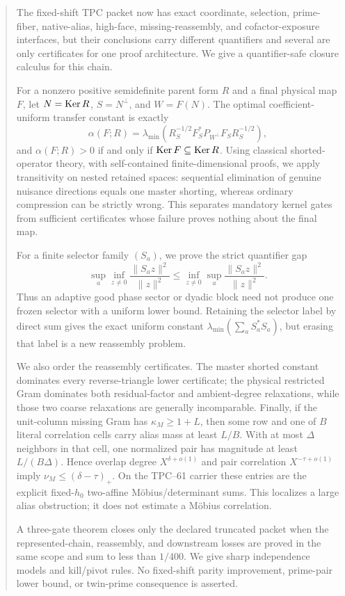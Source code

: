 \begin{abstract}
The fixed-shift TPC packet now has exact coordinate, selection, prime-fiber,
native-alias, high-face, missing-reassembly, and cofactor-exposure interfaces,
but their conclusions carry different quantifiers and several are only
certificates for one proof architecture.  We give a quantifier-safe closure
calculus for this chain.

For a nonzero positive semidefinite parent form \(R\) and a final physical
map \(F\), let \(N=\Ker R\), \(S=N^\perp\), and \(W=F(N)\).  The optimal
coefficient-uniform transfer constant is exactly
\[
 \alpha(F;R)=
 \lambda_{\min}\!\left(
 R_S^{-1/2}F_S^*P_{W^\perp}F_SR_S^{-1/2}
 \right),
\]
and \(\alpha(F;R)>0\) if and only if
\(\Ker F\subseteq\Ker R\).  Using classical shorted-operator theory, with
self-contained finite-dimensional proofs, we apply transitivity on nested
retained spaces: sequential elimination of genuine nuisance directions
equals one master shorting, whereas ordinary compression can be strictly
wrong.
This separates mandatory kernel gates from sufficient certificates whose
failure proves nothing about the final map.

For a finite selector family \((S_a)\), we prove the strict quantifier gap
\[
 \sup_a\inf_{z\ne0}\frac{\|S_az\|^2}{\|z\|^2}
 \le
 \inf_{z\ne0}\sup_a\frac{\|S_az\|^2}{\|z\|^2}.
\]
Thus an adaptive good phase sector or dyadic block need not produce one
frozen selector with a uniform lower bound.  Retaining the selector label by
direct sum gives the exact uniform constant
\(\lambda_{\min}(\sum_aS_a^*S_a)\), but erasing that label is a new
reassembly problem.

We also order the reassembly certificates.  The master shorted constant
dominates every reverse-triangle lower certificate; the physical restricted
Gram dominates both residual-factor and ambient-degree relaxations, while
those two coarse relaxations are generally incomparable.  Finally, if the
unit-column missing Gram has \(\kappa_M\ge1+L\), then some row and one of
\(B\) literal correlation cells carry alias mass at least \(L/B\).  With at most
\(\Delta\) neighbors in that cell, one normalized pair has magnitude at
least \(L/(B\Delta)\).  Hence overlap degree
\(X^{\delta+o(1)}\) and pair correlation
\(X^{-\tau+o(1)}\) imply
\(\nu_M\le(\delta-\tau)_+\).  On the TPC--61 carrier these entries are the
explicit fixed-\(h_0\) two-affine M\"obius/determinant sums.  This localizes
a large alias obstruction; it does not estimate a M\"obius correlation.

A three-gate theorem closes only the declared truncated packet when the
represented-chain, reassembly, and downstream losses are proved in the same
scope and sum to less than \(1/400\).  We give sharp independence models and
kill/pivot rules.  No fixed-shift parity improvement, prime-pair lower bound,
or twin-prime consequence is asserted.
\end{abstract}
